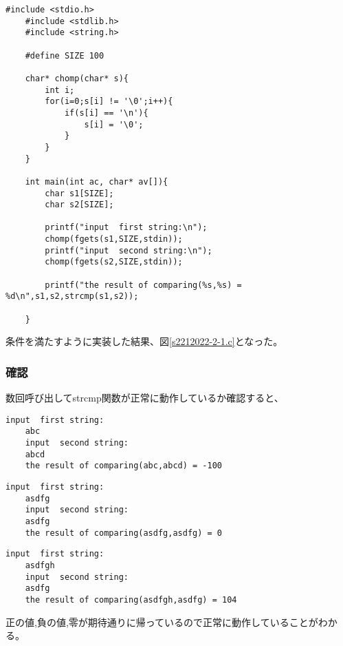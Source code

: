 \documentclass[fontsize = 10pt, paper= a4,twocolumn,column_gap=3zw]{jlreq}
\begin{document}
\begin{lstlisting}[basicstyle=\ttfamily\footnotesize, frame=single, caption=s2212022-2-1.c ,label=s2212022-2-1.c]
    #include <stdio.h>
    #include <stdlib.h>
    #include <string.h>
    
    #define SIZE 100
    
    char* chomp(char* s){
        int i;
        for(i=0;s[i] != '\0';i++){
            if(s[i] == '\n'){
                s[i] = '\0';
            }
        }
    }
    
    int main(int ac, char* av[]){
        char s1[SIZE];
        char s2[SIZE];
    
        printf("input  first string:\n");
        chomp(fgets(s1,SIZE,stdin));
        printf("input  second string:\n");
        chomp(fgets(s2,SIZE,stdin));
    
        printf("the result of comparing(%s,%s) = %d\n",s1,s2,strcmp(s1,s2));
       
    }
\end{lstlisting}

条件を満たすように実装した結果、図\ref{s2212022-2-1.c}となった。

\subsubsection{確認}
数回呼び出してstrcmp関数が正常に動作しているか確認すると、
\begin{lstlisting}[basicstyle=\ttfamily\footnotesize, frame=single, caption=test3,label=test3]
    input  first string:
    abc
    input  second string:
    abcd
    the result of comparing(abc,abcd) = -100

\end{lstlisting}

\begin{lstlisting}[basicstyle=\ttfamily\footnotesize, frame=single, caption=test4,label=test4]
    input  first string:
    asdfg
    input  second string:
    asdfg
    the result of comparing(asdfg,asdfg) = 0

\end{lstlisting}

\begin{lstlisting}[basicstyle=\ttfamily\footnotesize, frame=single, caption=test5,label=test5]
    input  first string:
    asdfgh
    input  second string:
    asdfg
    the result of comparing(asdfgh,asdfg) = 104    
\end{lstlisting}

正の値,負の値,零が期待通りに帰っているので正常に動作していることがわかる。
\end{document}
